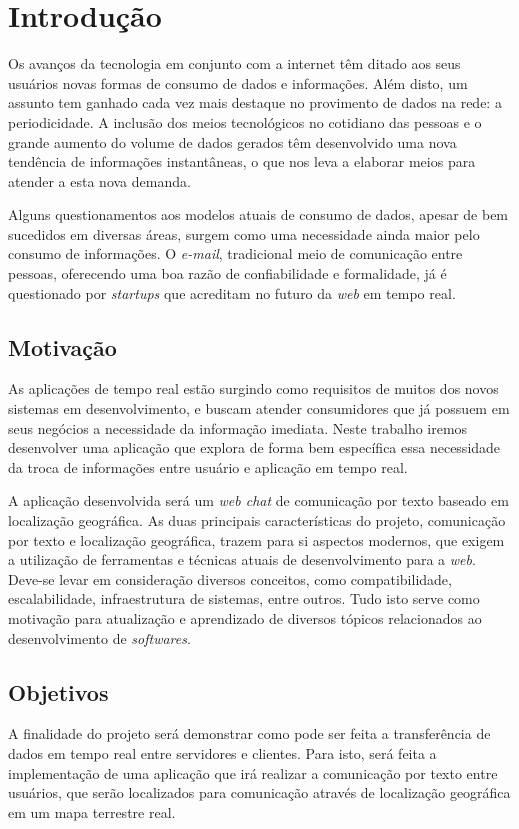 \chapter{Introdução}
Os avanços da tecnologia em conjunto com a internet têm ditado aos seus usuários novas formas de consumo de dados e informações. Além disto, um assunto tem ganhado cada vez mais destaque no provimento de dados na rede: a periodicidade. A inclusão dos meios tecnológicos no cotidiano das pessoas e o grande aumento do volume de dados gerados têm desenvolvido uma nova tendência de informações instantâneas, o que nos leva a elaborar meios para atender a esta nova demanda.

Alguns questionamentos aos modelos atuais de consumo de dados,  apesar de bem sucedidos em diversas áreas, surgem como uma necessidade ainda maior pelo consumo de informações. O \textit{e-mail}, tradicional meio de comunicação entre pessoas, oferecendo uma boa razão de confiabilidade e formalidade, já é questionado por \textit{startups} \cite{startup-email-innovation1} \cite{startup-email-innovation2} que acreditam no futuro da \textit{web} em tempo real.

\section{Motivação} 
As aplicações de tempo real estão surgindo como requisitos de muitos dos novos sistemas em desenvolvimento, e buscam atender consumidores que já possuem em seus negócios a necessidade da informação imediata. Neste trabalho iremos desenvolver uma aplicação que explora de forma bem específica essa necessidade da troca de informações entre usuário e aplicação em tempo real.

A aplicação desenvolvida será um \textit{web chat} de comunicação por texto baseado em localização geográfica. As duas principais características do projeto, comunicação por texto e localização geográfica, trazem para si aspectos modernos, que exigem a utilização de ferramentas e técnicas atuais de desenvolvimento para a \textit{web}. Deve-se levar em consideração diversos conceitos, como compatibilidade, escalabilidade, infraestrutura de sistemas, entre outros. Tudo isto serve como motivação para atualização e aprendizado de diversos tópicos relacionados ao desenvolvimento de \textit{softwares}.   

\section{Objetivos}
A finalidade do projeto será demonstrar como pode ser feita a transferência de dados em tempo real entre servidores e clientes. Para isto, será feita a implementação de uma aplicação que irá realizar a comunicação por texto entre usuários, que serão localizados para comunicação através de localização geográfica em um mapa terrestre real.

